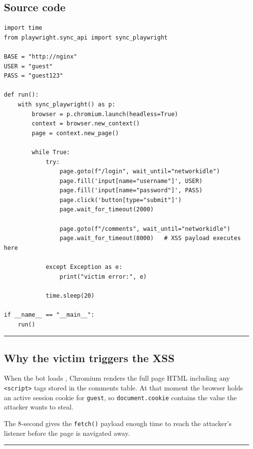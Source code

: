 \subsection{Source code}

\begin{lstlisting}
import time
from playwright.sync_api import sync_playwright

BASE = "http://nginx"
USER = "guest"
PASS = "guest123"

def run():
    with sync_playwright() as p:
        browser = p.chromium.launch(headless=True)
        context = browser.new_context()
        page = context.new_page()

        while True:
            try:
                page.goto(f"/login", wait_until="networkidle")
                page.fill('input[name="username"]', USER)
                page.fill('input[name="password"]', PASS)
                page.click('button[type="submit"]')
                page.wait_for_timeout(2000)

                page.goto(f"/comments", wait_until="networkidle")
                page.wait_for_timeout(8000)   # XSS payload executes here

            except Exception as e:
                print("victim error:", e)

            time.sleep(20)

if __name__ == "__main__":
    run()
\end{lstlisting}

\begin{center}\rule{0.5\linewidth}{0.5pt}\end{center}

\subsection{Why the victim triggers the XSS}

When the bot loads , Chromium renders the full page HTML including any \texttt{\textless{}script\textgreater{}} tags stored in the comments table. At that moment the browser holds an active session cookie for \texttt{guest}, so \texttt{document.cookie} contains the value the attacker wants to steal.

The 8-second  gives the \texttt{fetch()} payload enough time to reach the attacker's listener before the page is navigated away.

\begin{center}\rule{0.5\linewidth}{0.5pt}\end{center}

